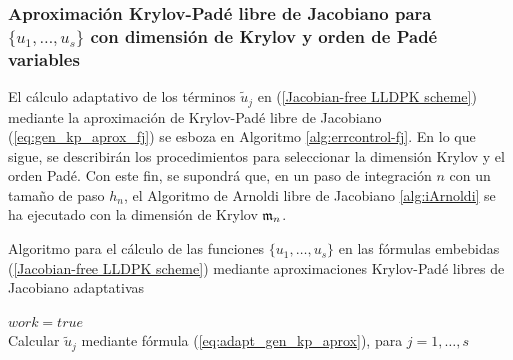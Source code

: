 \subsubsection{Aproximación Krylov-Padé libre de Jacobiano para $\{ u_1,\ldots, u_s \}$ con dimensión de Krylov y orden de Padé variables}

El cálculo adaptativo de los términos $\widetilde{u}_j$ en (\ref{Jacobian-free LLDPK scheme}) mediante la aproximación de Krylov-Padé libre de Jacobiano (\ref{eq:gen_kp_aprox_fj}) se esboza en Algoritmo \ref{alg:errcontrol-fj}. En lo que sigue, se describirán los procedimientos para seleccionar la dimensión Krylov y el orden Padé. Con este fin, se supondrá que, en un paso de integración $n$ con un tamaño de paso $h_n$, el Algoritmo de Arnoldi libre de Jacobiano \ref{alg:iArnoldi} se ha ejecutado con la dimensión de Krylov $\mathfrak{m}_n$. 

{\SetAlgoNoLine
	\begin{algorithm}[htb]
		\caption{Algoritmo para el cálculo de las funciones $\{u_1,\dots,u_s\}$ en las fórmulas embebidas (\ref{Jacobian-free LLDPK scheme}) mediante aproximaciones Krylov-Padé libres de Jacobiano adaptativas}
		\label{alg:errcontrol-fj}
		$work=true$\\
		Calcular $\widetilde{u}_j$ mediante fórmula (\ref{eq:adapt_gen_kp_aprox}), para $j=1,\dots,s$\\
\end{algorithm}}

